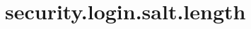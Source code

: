 \section{security.login.salt.length}
\label{configuration:SecurityLoginSaltLength}
\AvailableInJavaOnly{\TODO}